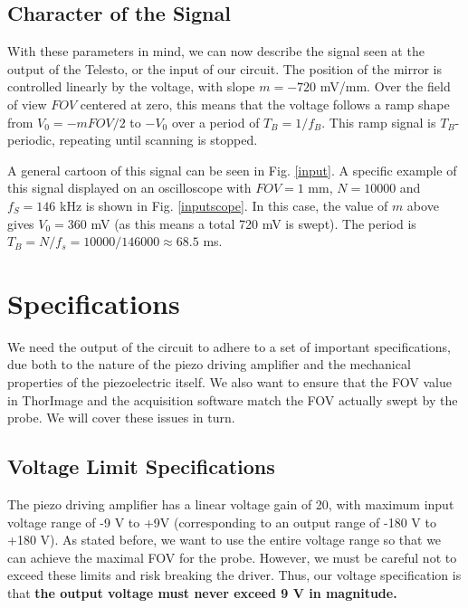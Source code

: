 \documentclass{article}
\begin{document}
\subsection{Character of the Signal}
\par{With these parameters in mind, we can now describe the signal seen at the output of the Telesto, or the input of our circuit. The position of the mirror is controlled linearly by the voltage, with slope $m=-720$ mV/mm. Over the field of view $FOV$ centered at zero, this means that the voltage follows a ramp shape from $V_0=-mFOV/2$ to $-V_0$ over a period of $T_B = 1/f_B$. This ramp signal is $T_B$-periodic, repeating until scanning is stopped.}
\par{A general cartoon of this signal can be seen in Fig. \ref{input}. A specific example of this signal displayed on an oscilloscope with $FOV=1$ mm, $N=10000$ and $f_S = 146$ kHz is shown in Fig. \ref{inputscope}. In this case, the value of $m$ above gives $V_0 = 360$ mV (as this means a total 720 mV is swept). The period is $T_B = N/f_s = 10000/146000\approx68.5$ ms.}


\section{Specifications}
\par{We need the output of the circuit to adhere to a set of important specifications, due both to the nature of the piezo driving amplifier and the mechanical properties of the piezoelectric itself. We also want to ensure that the FOV value in ThorImage and the acquisition software match the FOV actually swept by the probe. We will cover these issues in turn.}
\subsection{Voltage Limit Specifications}
\par{The piezo driving amplifier has a linear voltage gain of 20, with maximum input voltage range of -9 V to +9V (corresponding to an output range of -180 V to +180 V). As stated before, we want to use the entire voltage range so that we can achieve the maximal FOV for the probe. However, we must be careful not to exceed these limits and risk breaking the driver. Thus, our voltage specification is that \textbf{the output voltage must never exceed 9 V in magnitude.}}
\end{document}
